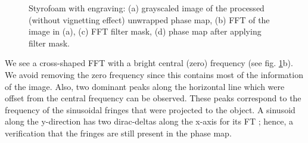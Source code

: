 \begin{figure}[h!]
	\centering
	\caption[FFT of styrofoam board with engraving]{Styrofoam with engraving: (a) grayscaled image of the processed (without vignetting effect) unwrapped phase map, (b) FFT of the image in (a), (c) FFT filter mask, (d) phase map after applying filter mask.}
	\label{fig:Vfft}
\end{figure}

We see a cross-shaped FFT with a bright central (zero) frequency (see fig. \ref{fig:Vfft}b). 
We avoid removing the zero frequency since this contains most of the information of the image.
Also, two dominant peaks along the horizontal line which were offset from the central frequency can be observed. 
These peaks correspond to the frequency of the sinusoidal fringes that were projected to the object.
A sinusoid along the y-direction has two dirac-deltas along the x-axis for its FT \cite{Wahl1987}; hence, a verification that the fringes are still present in the phase map.

